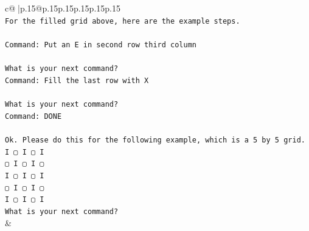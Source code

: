 \documentclass{article}
\begin{document}
{\begin{supertabular}{c@{$\;$}|p{.15\linewidth}@{}p{.15\linewidth}p{.15\linewidth}p{.15\linewidth}p{.15\linewidth}p{.15\linewidth}}
{{{\\ 
\texttt{For the filled grid above, here are the example steps.} \\
\\ 
\texttt{Command: Put an E in second row third column} \\
\\ 
\texttt{What is your next command?} \\
\texttt{Command: Fill the last row with X} \\
\\ 
\texttt{What is your next command?} \\
\texttt{Command: DONE} \\
\\ 
\texttt{Ok. Please do this for the following example, which is a 5 by 5 grid.} \\
\texttt{I ▢ I ▢ I} \\
\texttt{▢ I ▢ I ▢} \\
\texttt{I ▢ I ▢ I} \\
\texttt{▢ I ▢ I ▢} \\
\texttt{I ▢ I ▢ I} \\
\texttt{What is your next command?} \\
            }
        }
    }
    & \\ \\


\end{supertabular}}
\end{document}
